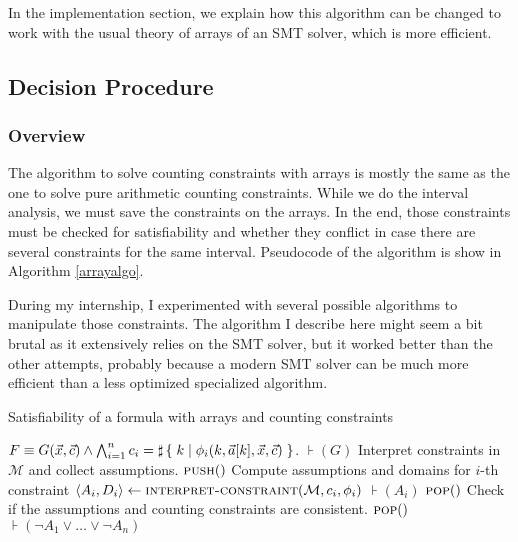 In the implementation section, we explain
how this algorithm can be changed to work with the usual theory of arrays of an
SMT solver, which is more efficient.

\subsection{Decision Procedure}

\subsubsection{Overview}

The algorithm to solve counting constraints with arrays is mostly the
same as the one to solve pure arithmetic counting constraints. While we do the interval analysis,
we must save the constraints on the arrays. In the end, those constraints must be checked for
satisfiability and whether they conflict in case there are several constraints
for the same interval. Pseudocode of the algorithm is show in Algorithm
\ref{arrayalgo}.

During my internship, I experimented with several possible algorithms to
manipulate those constraints. The algorithm I describe here might seem a
bit brutal as it extensively relies on the SMT solver, but it
worked better than the other attempts, probably because a modern SMT
solver can be much more efficient than a less optimized specialized
algorithm.

\begin{algorithm}[h]
\caption{Satisfiability of a formula with arrays and counting constraints}
\begin{algorithmic}[1]
\Require $F \equiv G(\vec{x}, \vec{c}) \land \bigwedge_{i=1}^n c_i =
\sharp\left\lbrace\;k\;|\;\phi_i(k, \vec{a}[k], \vec{x}, \vec{c})\;\right\rbrace$.
\State $\assert(G)$
    \LineComment Interpret constraints in $\mathcal{M}$ and collect assumptions.
    \State $\textsc{push}()$
        \LineComment Compute assumptions and domains for $i$-th constraint
        \State $\langle A_i, D_i \rangle \gets \textsc{interpret-constraint}(\mathcal{M}, c_i, \phi_i)$
        \State $\assert(A_i)$
			\State $\textsc{pop}()$
            \State {}
            \State {}
        \EndIf
    \EndFor
    \State {}
    \State {}
    \State {}
    \State {}
    \State {}
    \LineComment Check if the assumptions and counting constraints are consistent.
        \State {}
    \EndIf
    \State $\textsc{pop}()$
    \State $\assert(\lnot A_1 \vee \ldots \vee \lnot A_n)$
\EndWhile
\State \Return{\unsat}
\EndProcedure
\end{algorithmic}
\label{arrayalgo}
\end{algorithm}

